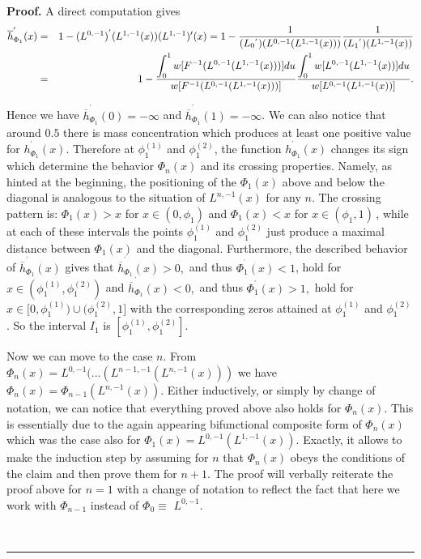 \documentclass[onecolumn]{article}
\providecommand{\dint}{\displaystyle\int}
\newenvironment{proof}[1][Proof]{\noindent\textbf{#1.} }{\ \rule{0.5em}{0.5em}}
\renewcommand{\dint}{\displaystyle\int}
\begin{document}
\begin{proof}
A direct computation gives%
\begin{eqnarray}
\overline{h}_{\Phi _{1}}^{^{\prime }}(x) &=&1-(L^{0,-1})^{^{\prime
}}(L^{1,-1}(x))(L^{1,-1})^{\prime }(x)=1-\frac{1}{(L_{0}{}^{^{\prime
}})(L^{0,-1}(L^{1,-1}(x)))}\frac{1}{(L_{1}{}^{^{\prime }})(L^{1,-1}(x))} 
\notag \\
&=&1-\frac{\dint\nolimits_{0}^{1}w[F^{-1}(L^{0,-1}(L^{1,-1}(x)))]du}{%
w[F^{-1}(L^{0,-1}(L^{1,-1}(x)))]}\frac{\dint%
\nolimits_{0}^{1}w[L^{0,-1}(L^{1,-1}(x))]du}{w[L^{0,-1}(L^{1,-1}(x))]}.
\label{175.1}
\end{eqnarray}

Hence we have $\overline{h}_{\Phi _{1}}^{^{\prime }}(0)=-\infty $ and $%
\overline{h}_{\Phi _{1}}^{^{\prime }}(1)=-\infty $. We can also notice that
around $0.5$ there is mass concentration which produces at least one
positive value for $h_{\Phi _{1}}^{^{\prime }}(x)$. Therefore at $\phi
_{1}^{(1)}$ and $\phi _{1}^{(2)}$, the function $h_{\Phi _{1}}^{^{\prime
}}(x)$ changes its sign which determine the behavior $\Phi _{n}(x)$ and its
crossing properties. Namely, as hinted at the beginning, the positioning of
the $\Phi _{1}(x)$ above and below the diagonal is analogous to the
situation of $L^{n,-1}(x)$ for any $n$. The crossing pattern is: $\Phi
_{1}(x)>x$ for $x\in (0,\phi _{1})$ and $\Phi _{1}(x)<x$ for $x\in (\phi
_{1},1)\,$, while at each of these intervals the points $\phi _{1}^{(1)}$
and $\phi _{1}^{(2)}$ just produce a maximal distance between $\Phi _{1}(x)$
and the diagonal. Furthermore, the described behavior of $\overline{h}_{\Phi
_{1}}^{^{\prime }}(x)$ gives that $\overline{h}_{\Phi _{1}}^{^{\prime
}}(x)>0,$ and thus $\Phi _{1}^{^{\prime }}(x)<1$, hold for $x\in (\phi
_{1}^{(1)},\phi _{1}^{(2)})$ and $\overline{h}_{\Phi _{1}}^{^{\prime
}}(x)<0, $ and thus $\Phi _{1}^{^{\prime }}(x)>1,$ hold for $x\in \lbrack
0,\phi _{1}^{(1)})\cup (\phi _{1}^{(2)},1]$ with the corresponding zeros
attained at $\phi _{1}^{(1)}$ and $\phi _{1}^{(2)}$. So the interval $I_{1}$
is $[\phi _{1}^{(1)},\phi _{1}^{(2)}]$.

Now we can move to the case $n$. From $\Phi
_{n}(x)=L^{0,-1}(...(L^{n-1,-1}(L^{n,-1}(x)))$ we have $\Phi _{n}(x)=\Phi
_{n-1}(L^{n,-1}(x))$. Either inductively, or simply by change of notation,
we can notice that everything proved above also holds for $\Phi _{n}(x)$.
This is essentially due to the again appearing bifunctional composite form
of $\Phi _{n}(x)$ which was the case also for $\Phi
_{1}(x)=L^{0,-1}(L^{1,-1}(x))$. Exactly, it allows to make the induction
step by assuming for $n$ that $\Phi _{n}(x)$ obeys the conditions of the
claim and then prove them for $n+1$. The proof will verbally reiterate the
proof above for $n=1$ with a change of notation to reflect the fact that
here we work with $\Phi _{n-1}$ instead of $\Phi _{0}\equiv $ $L^{0,-1}$.


\end{proof}
\end{document}
